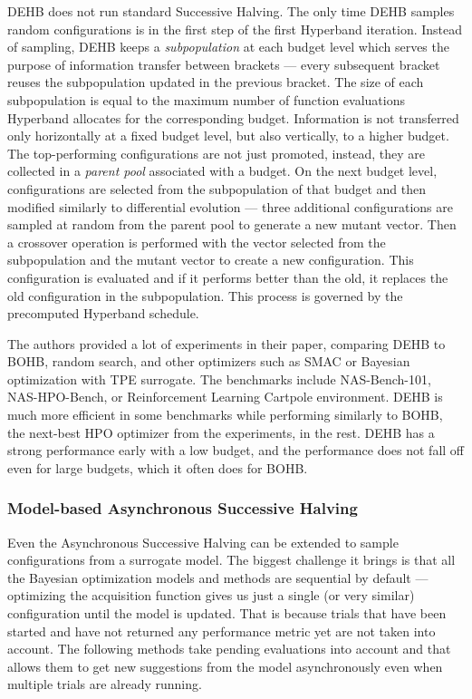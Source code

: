 DEHB does not run standard Successive Halving. The only time DEHB samples random configurations is in the first step of the first Hyperband iteration. Instead of sampling, DEHB keeps a \textit{subpopulation} at each budget level which serves the purpose of information transfer between brackets --- every subsequent bracket reuses the subpopulation updated in the previous bracket. The size of each subpopulation is equal to the maximum number of function evaluations Hyperband allocates for the corresponding budget. Information is not transferred only horizontally at a fixed budget level, but also vertically, to a higher budget. The top-performing configurations are not just promoted, instead, they are collected in a \textit{parent pool} associated with a budget. On the next budget level, configurations are selected from the subpopulation of that budget and then modified similarly to differential evolution --- three additional configurations are sampled at random from the parent pool to generate a new mutant vector. Then a crossover operation is performed with the vector selected from the subpopulation and the mutant vector to create a new configuration. This configuration is evaluated and if it performs better than the old, it replaces the old configuration in the subpopulation. This process is governed by the precomputed Hyperband schedule.

The authors provided a lot of experiments in their paper, comparing DEHB to BOHB, random search, and other optimizers such as SMAC or Bayesian optimization with TPE surrogate. The benchmarks include NAS-Bench-101, NAS-HPO-Bench, or Reinforcement Learning Cartpole environment. DEHB is much more efficient in some benchmarks while performing similarly to BOHB, the next-best HPO optimizer from the experiments, in the rest. DEHB has a strong performance early with a low budget, and the performance does not fall off even for large budgets, which it often does for BOHB.\@

\subsubsection{Model-based Asynchronous Successive Halving}
Even the Asynchronous Successive Halving can be extended to sample configurations from a surrogate model. The biggest challenge it brings is that all the Bayesian optimization models and methods are sequential by default --- optimizing the acquisition function gives us just a single (or very similar) configuration until the model is updated. That is because trials that have been started and have not returned any performance metric yet are not taken into account. The following methods take pending evaluations into account and that allows them to get new suggestions from the model asynchronously even when multiple trials are already running.

